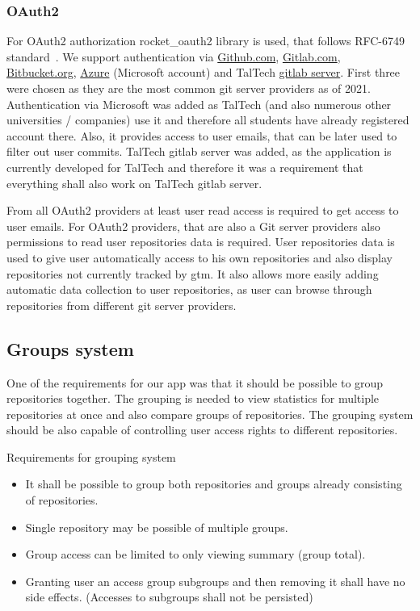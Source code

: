 \subsubsection{OAuth2}\label{subsubsec:oauth2}
For OAuth2 authorization rocket{\_}oauth2 library is used, that follows RFC-6749 standard~\cite{rocket-oauth2, oauth2}.
We support authentication via \href{https://github.com/}{Github.com}, \href{https://about.gitlab.com/}{Gitlab.com},
\href{https://bitbucket.org/}{Bitbucket.org}, \href{https://azure.microsoft.com/}{Azure} (Microsoft account) and
TalTech \href{https://gitlab.cs.ttu.ee/}{gitlab server}.
First three were chosen as they are the most common git server providers as of 2021.
Authentication via Microsoft was added as TalTech (and also numerous other universities / companies) use it and therefore
all students have already registered account there.
Also, it provides access to user emails, that can be later used to filter out user commits.
TalTech gitlab server was added, as the application is currently developed for TalTech and therefore it was a requirement
that everything shall also work on TalTech gitlab server.

From all OAuth2 providers at least user read access is required to get access to user emails.
For OAuth2 providers, that are also a Git server providers also permissions to read user repositories data is required.
User repositories data is used to give user automatically access to his own repositories and also display repositories
not currently tracked by gtm.
It also allows more easily adding automatic data collection to user repositories, as user can browse through
repositories from different git server providers.

\subsection{Groups system}\label{subsec:group-system}
One of the requirements for our app was that it should be possible to group repositories together.
The grouping is needed to view statistics for multiple repositories at once and also compare groups of repositories.
The grouping system should be also capable of controlling user access rights to different repositories.

Requirements for grouping system
\begin{itemize}
    \item It shall be possible to group both repositories and groups already consisting of repositories.
    \item Single repository may be possible of multiple groups.
    \item Group access can be limited to only viewing summary (group total).
    \item Granting user an access group subgroups and then removing it shall have no side effects. (Accesses to subgroups shall not be persisted)
\end{itemize}


